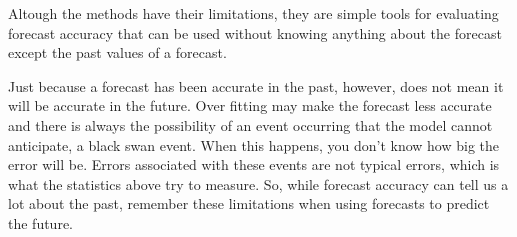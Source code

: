 Altough the methods have their limitations, they are simple tools for evaluating forecast accuracy that can be used without knowing anything about the forecast except the past values of a forecast.

Just because a forecast has been accurate in the past, however, does not mean it will be accurate in the future. Over fitting may make the forecast less accurate and there is always the possibility of an event occurring that the model cannot anticipate, a black swan event. When this happens, you don’t know how big the error will be. Errors associated with these events are not typical errors, which is what the statistics above try to measure. So, while forecast accuracy can tell us a lot about the past, remember these limitations when using forecasts to predict the future.

\fi